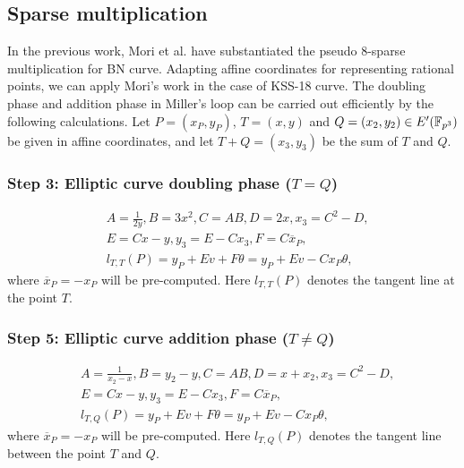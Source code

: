 \subsection{Sparse multiplication }
In the previous work, Mori et al. \cite{PAIRING:MANS13} have substantiated the pseudo 8-sparse multiplication for BN curve. 
Adapting affine coordinates for representing rational points, we can apply Mori's work in the case of KSS-18 curve. The doubling phase and addition phase in Miller's loop can be carried out efficiently by the following calculations. Let $P=(x_P,y_P)$, $T=(x,y)$ and $Q=(x_2,y_2)\in E'(\mathbb{F}_{p^{3}})$ be given in affine coordinates, and let $T+Q=(x_3,y_3)$ be the sum of $T$ and $Q$.
\subsubsection{Step 3: Elliptic curve doubling phase \texorpdfstring{($T = Q$)}{}}
\begin{eqnarray}
&A=\frac{1}{2y}, B=3x^2, C=AB, D=2x, x_3=C^2-D,\nonumber\\
&E=Cx-y, y_3=E-Cx_3, F=C\overline{x}_P,\nonumber\\
&l_{T,T}(P)=y_P+Ev+F\theta=y_P+Ev-Cx_P\theta,\label{icisc16_kss18_sparse_dbl}
\end{eqnarray}
where $\overline{x}_P=-x_P$ will be pre-computed. Here $l_{T,T}(P)$ denotes the tangent line at the point $T$.
\subsubsection{Step 5: Elliptic curve addition phase \texorpdfstring{($T\neq Q$)}{}}
\begin{eqnarray}
&A=\frac{1}{x_2-x}, B=y_2-y, C=AB, D=x+x_2, x_3=C^2-D,\nonumber\\
&E=Cx-y, y_3=E-Cx_3, F=C\overline{x}_P,\nonumber\\
&l_{T,Q}(P)=y_P+Ev+F\theta=y_P+Ev-Cx_P\theta,\label{icisc16_kss18_sparse_add}
\end{eqnarray}
where $\overline{x}_P=-x_P$ will be pre-computed. Here $l_{T,Q}(P)$ denotes the tangent line between the point $T$ and $Q$.

